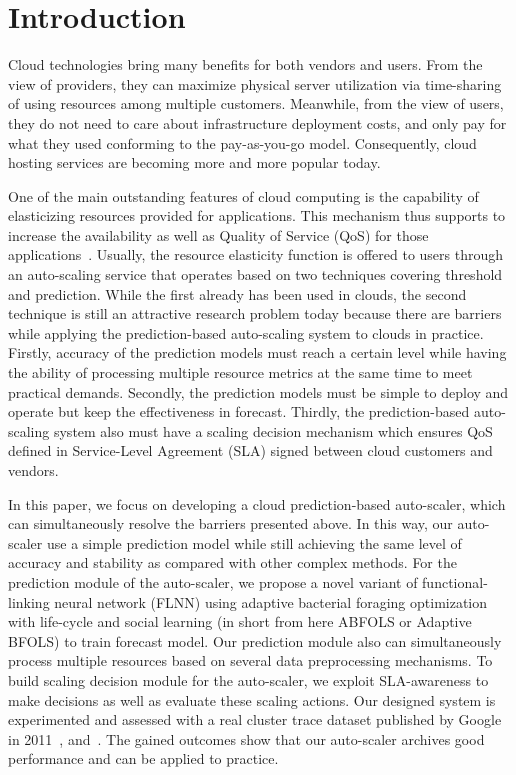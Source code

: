 \documentclass[runningheads]{llncs}
\begin{document}
\section{Introduction}
\label{intro}

Cloud technologies bring many benefits for both vendors and users. From the view of providers, they can maximize physical server utilization via time-sharing of using resources among multiple customers. Meanwhile, from the view of users, they do not need to care about infrastructure deployment costs, and only pay for what they used conforming to the pay-as-you-go model. Consequently, cloud hosting services are becoming more and more popular today.

One of the main outstanding features of cloud computing is the capability of elasticizing resources provided for applications. This mechanism thus supports to increase the availability as well as Quality of Service (QoS) for those applications~\cite{ref_hluchy}. Usually, the resource elasticity function is offered to users through an auto-scaling service that operates based on two techniques covering threshold and prediction. While the first already has been used in clouds, the second technique is still an attractive research problem today because there are barriers while applying the prediction-based auto-scaling system to clouds in practice. Firstly, accuracy of the prediction models must reach a certain level while having the ability of processing multiple resource metrics at the same time to meet practical demands. Secondly, the prediction models must be simple to deploy and operate but keep the effectiveness in forecast. Thirdly, the prediction-based auto-scaling system also must have a scaling decision mechanism which ensures QoS defined in Service-Level Agreement (SLA) signed between cloud customers and vendors. 


In this paper, we focus on developing a cloud prediction-based auto-scaler, which can simultaneously resolve the barriers presented above. In this way, our auto-scaler use a simple prediction model while still achieving the same level of accuracy and stability as compared with other complex methods. For the prediction module of the auto-scaler, we propose a novel variant of functional-linking neural network (FLNN) using adaptive bacterial foraging optimization with life-cycle and social learning (in short from here ABFOLS or Adaptive BFOLS) to train forecast model. Our prediction module also can simultaneously process multiple resources based on several data preprocessing mechanisms. To build scaling decision module for the auto-scaler, we exploit SLA-awareness to make decisions as well as evaluate these scaling actions. Our designed system is experimented and assessed with a real cluster trace dataset published by Google in 2011~\cite{clusterdata:Reiss2011}, and~\cite{ref_google_trace}. The gained outcomes show that our auto-scaler archives good performance and can be applied to practice.
\end{document}
